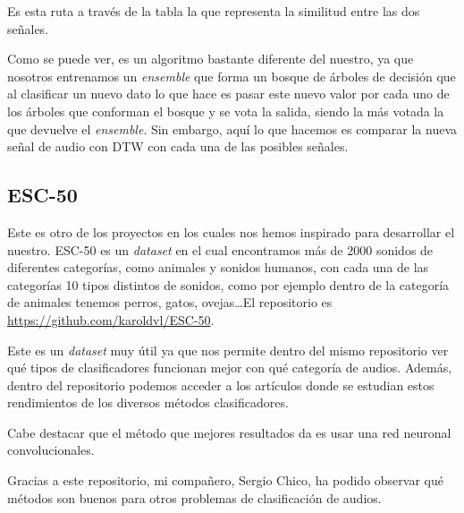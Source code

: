 Es esta ruta a través de la tabla la que representa la similitud entre las dos señales.

Como se puede ver, es un algoritmo bastante diferente del nuestro, ya que nosotros entrenamos un \textit{ensemble} que forma un bosque de árboles de decisión que al clasificar un nuevo dato lo que hace es pasar este nuevo valor por cada uno de los árboles que conforman el bosque y se vota la salida, siendo la más votada la que devuelve el \textit{ensemble}. Sin embargo, aquí lo que hacemos es comparar la nueva señal de audio con DTW con cada una de las posibles señales.

\subsection{ESC-50}
Este es otro de los proyectos en los cuales nos hemos inspirado para desarrollar el nuestro. ESC-50 es un \textit{dataset} en el cual encontramos más de 2000 sonidos de diferentes categorías, como animales y sonidos humanos, con cada una de las categorías 10 tipos distintos de sonidos, como por ejemplo dentro de la categoría de animales tenemos perros, gatos, ovejas\ldots El repositorio es \url{https://github.com/karoldvl/ESC-50}.

Este es un \textit{dataset}  muy útil ya que nos permite dentro del mismo repositorio ver qué tipos de clasificadores funcionan mejor con qué categoría de audios. Además, dentro del repositorio podemos acceder a los artículos donde se estudian estos rendimientos de los diversos métodos clasificadores.

Cabe destacar que el método que mejores resultados da es usar una red neuronal convolucionales.

Gracias a este repositorio, mi compañero, Sergio Chico, ha podido observar qué métodos son buenos para otros problemas de clasificación de audios.
